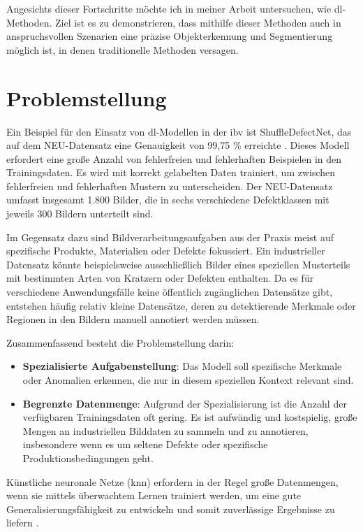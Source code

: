 Angesichts dieser Fortschritte möchte ich in meiner Arbeit untersuchen, wie \gls{dl}-Methoden. Ziel ist es zu demonstrieren, dass mithilfe dieser Methoden auch in anspruchsvollen Szenarien eine präzise Objekterkennung und Segmentierung möglich ist, in denen traditionelle Methoden versagen.

\section{Problemstellung}\label{expose_problemstellung}

Ein Beispiel für den Einsatz von \gls{dl}-Modellen in der \gls{ibv} ist ShuffleDefectNet, das auf dem NEU-Datensatz eine Genauigkeit von 99,75 \% erreichte \cite{saberironaghi_defect_2023}. Dieses Modell erfordert eine große Anzahl von fehlerfreien und fehlerhaften Beispielen in den Trainingsdaten. Es wird mit korrekt gelabelten Daten trainiert, um zwischen fehlerfreien und fehlerhaften Mustern zu unterscheiden. Der NEU-Datensatz umfasst insgesamt 1.800 Bilder, die in sechs verschiedene Defektklassen mit jeweils 300 Bildern unterteilt sind.

Im Gegensatz dazu sind Bildverarbeitungsaufgaben aus der Praxis meist auf spezifische Produkte, Materialien oder Defekte fokussiert. Ein industrieller Datensatz könnte beispielsweise ausschließlich Bilder eines speziellen Musterteils mit bestimmten Arten von Kratzern oder Defekten enthalten. Da es für verschiedene Anwendungsfälle keine öffentlich zugänglichen Datensätze gibt, entstehen häufig relativ kleine Datensätze, deren zu detektierende Merkmale oder Regionen in den Bildern manuell annotiert werden müssen.

Zusammenfassend besteht die Problemstellung darin:

\begin{itemize} 
\item \textbf{Spezialisierte Aufgabenstellung}: Das Modell soll spezifische Merkmale oder Anomalien erkennen, die nur in diesem speziellen Kontext relevant sind. 
\item \textbf{Begrenzte Datenmenge}: Aufgrund der Spezialisierung ist die Anzahl der verfügbaren Trainingsdaten oft gering. Es ist aufwändig und kostspielig, große Mengen an industriellen Bilddaten zu sammeln und zu annotieren, insbesondere wenn es um seltene Defekte oder spezifische Produktionsbedingungen geht. 
\end{itemize}

Künstliche neuronale Netze (\gls{knn}) erfordern in der Regel große Datenmengen, wenn sie mittels überwachtem Lernen trainiert werden, um eine gute Generalisierungsfähigkeit zu entwickeln und somit zuverlässige Ergebnisse zu liefern \cite{lecun_deep_2015}.

